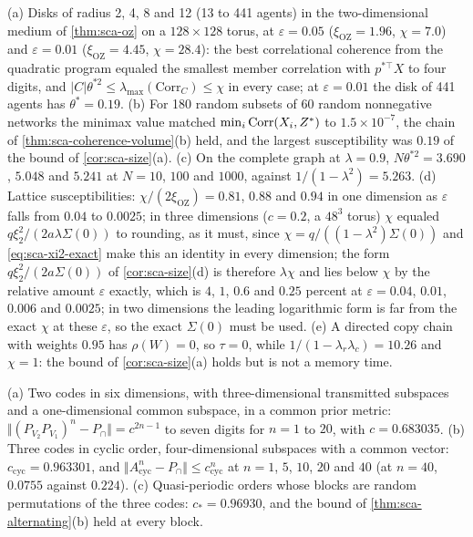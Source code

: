 \begin{numcheck}\label{chk:sca-coherence-volume}
(a) Disks of radius 2, 4, 8 and 12 (13 to 441 agents) in the two-dimensional medium of \cref{thm:sca-oz} on a $128\times128$ torus, at $\varepsilon=0.05$ ($\xi_{\mathrm{OZ}}=1.96$, $\chi=7.0$) and $\varepsilon=0.01$ ($\xi_{\mathrm{OZ}}=4.45$, $\chi=28.4$): the best correlational coherence from the quadratic program equaled the smallest member correlation with $p^{\ast\top}X$ to four digits, and $|C|\theta^{\ast2}\le\lambda_{\max}(\mathrm{Corr}_C)\le\chi$ in every case; at $\varepsilon=0.01$ the disk of 441 agents has $\theta^\ast=0.19$. (b) For 180 random subsets of 60 random nonnegative networks the minimax value matched $\min_i\operatorname{Corr}(X_i,Z^\ast)$ to $1.5\times10^{-7}$, the chain of \cref{thm:sca-coherence-volume}(b) held, and the largest susceptibility was $0.19$ of the bound of \cref{cor:sca-size}(a). (c) On the complete graph at $\lambda=0.9$, $N\theta^{\ast2}=3.690$, $5.048$ and $5.241$ at $N=10$, $100$ and $1000$, against $1/(1-\lambda^2)=5.263$. (d) Lattice susceptibilities: $\chi/(2\xi_{\mathrm{OZ}})=0.81$, $0.88$ and $0.94$ in one dimension as $\varepsilon$ falls from $0.04$ to $0.0025$; in three dimensions ($c=0.2$, a $48^3$ torus) $\chi$ equaled $q\xi_2^2/(2a\lambda\Sigma(0))$ to rounding, as it must, since $\chi=q/((1-\lambda^2)\Sigma(0))$ and \cref{eq:sca-xi2-exact} make this an identity in every dimension; the form $q\xi_2^2/(2a\Sigma(0))$ of \cref{cor:sca-size}(d) is therefore $\lambda\chi$ and lies below $\chi$ by the relative amount $\varepsilon$ exactly, which is $4$, $1$, $0.6$ and $0.25$ percent at $\varepsilon=0.04$, $0.01$, $0.006$ and $0.0025$; in two dimensions the leading logarithmic form is far from the exact $\chi$ at these $\varepsilon$, so the exact $\Sigma(0)$ must be used. (e) A directed copy chain with weights $0.95$ has $\rho(W)=0$, so $\tau=0$, while $1/(1-\lambda_r\lambda_c)=10.26$ and $\chi=1$: the bound of \cref{cor:sca-size}(a) holds but is not a memory time.
\end{numcheck}

\begin{numcheck}\label{chk:sca-alternating}
(a) Two codes in six dimensions, with three-dimensional transmitted subspaces and a one-dimensional common subspace, in a common prior metric: $\Vert(P_{V_2}P_{V_1})^n-P_\cap\Vert=c^{2n-1}$ to seven digits for $n=1$ to $20$, with $c=0.683035$. (b) Three codes in cyclic order, four-dimensional subspaces with a common vector: $c_{\mathrm{cyc}}=0.963301$, and $\Vert A_{\mathrm{cyc}}^n-P_\cap\Vert\le c_{\mathrm{cyc}}^n$ at $n=1$, $5$, $10$, $20$ and $40$ (at $n=40$, $0.0755$ against $0.224$). (c) Quasi-periodic orders whose blocks are random permutations of the three codes: $c_\ast=0.96930$, and the bound of \cref{thm:sca-alternating}(b) held at every block.
\end{numcheck}

